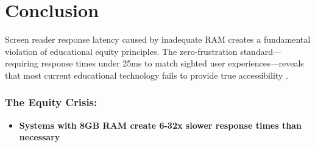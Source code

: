 \section{Conclusion}\label{chapter1-conclusion}

Screen reader response latency caused by inadequate RAM creates a fundamental violation of educational equity principles. The zero-frustration standard—requiring response times under 25ms to match sighted user experiences—reveals that most current educational technology fails to provide true accessibility \cite{EducationalEquityReport2024, W3C2018WCAG21}.

\subsubsection{The Equity Crisis:}

\begin{itemize}
\item \textbf{Systems with 8GB RAM create 6-32x slower response times than necessary} \cite{EducationalEquityReport2024}
\end{itemize}

